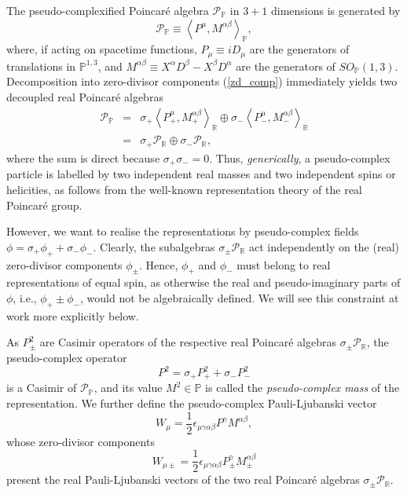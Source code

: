 \documentclass[a4paper,aps,prd,showkeys,showpacs,superscriptaddress,preprint]{revtex4}
\newcommand{\pc}{\mathbb{P}}
\newcommand{\reals}{\mathbb{R}}
\begin{document}
The pseudo-complexified Poincar\'e algebra $\mathcal{P}_\pc$ in $3+1$
dimensions is generated by  
\begin{equation}
  \mathcal{P}_\pc \equiv \left<P^\mu,
  M^{\alpha\beta}\right>_\pc, 
\end{equation}
where, if acting on spacetime functions, $P_\mu \equiv i D_\mu$ are
the generators of translations in $\pc^{1,3}$, and $M^{\alpha\beta} \equiv
X^\alpha D^\beta - X^\beta D^\alpha$ are the generators of $SO_\pc(1,3)$. Decomposition into zero-divisor
components (\ref{zd_comp}) immediately yields two decoupled real Poincar\'e algebras
\begin{eqnarray}
 \mathcal{P}_\pc &=& \sigma_+ \left<P_+^\mu,
 M_+^{\alpha\beta}\right>_\reals \oplus \sigma_- \left<P_-^\mu,
 M_-^{\alpha\beta}\right>_\reals \nonumber\\
 &=& \sigma_+ \mathcal{P}_\reals \oplus \sigma_- \mathcal{P}_\reals \label{PPdecomp},
\end{eqnarray}
where the sum is direct because $\sigma_+ \sigma_- = 0$.
Thus, \textsl{generically}, a
pseudo-complex particle is labelled by two independent real masses 
and two independent spins or helicities, as follows from the
well-known representation theory of the real Poincar\'e group. 

However, we want to realise the representations by pseudo-complex fields $\phi =
\sigma_+ \phi_+ + \sigma_- \phi_-$. Clearly, the subalgebras $\sigma_\pm
\mathcal{P}_\reals$ act independently on the (real) zero-divisor
components $\phi_\pm$. Hence, $\phi_+$ and $\phi_-$ must belong to real
representations of equal spin,  as otherwise the real and
pseudo-imaginary parts of $\phi$, i.e., $\phi_+ \pm \phi_-$, would not
be algebraically defined. We will see this constraint at work more explicitly below.

As $P_\pm^2$ are Casimir operators of the respective real Poincar\'e
algebras $\sigma_\pm \mathcal{P}_\reals$, the
pseudo-complex operator
\begin{equation}
  P^2 = \sigma_+ P_+^2 + \sigma_- P_-^2
\end{equation}
is a Casimir of $\mathcal{P}_\pc$, and its value $M^2 \in \pc$ is
called the \textsl{pseudo-complex mass} of the representation. We
further define the pseudo-complex Pauli-Ljubanski vector
\begin{equation}
  W_\mu = \frac{1}{2} \epsilon_{\mu\gamma\alpha\beta} P^\gamma M^{\alpha\beta},
\end{equation}
whose zero-divisor components 
\begin{equation}
  W_{\mu\pm} = \frac{1}{2} \epsilon_{\mu\gamma\alpha\beta} P_\pm^\gamma
  M_\pm^{\alpha\beta}
\end{equation}
present the real Pauli-Ljubanski vectors of the two real Poincar\'e
algebras $\sigma_\pm \mathcal{P}_\reals$. 
\end{document}
